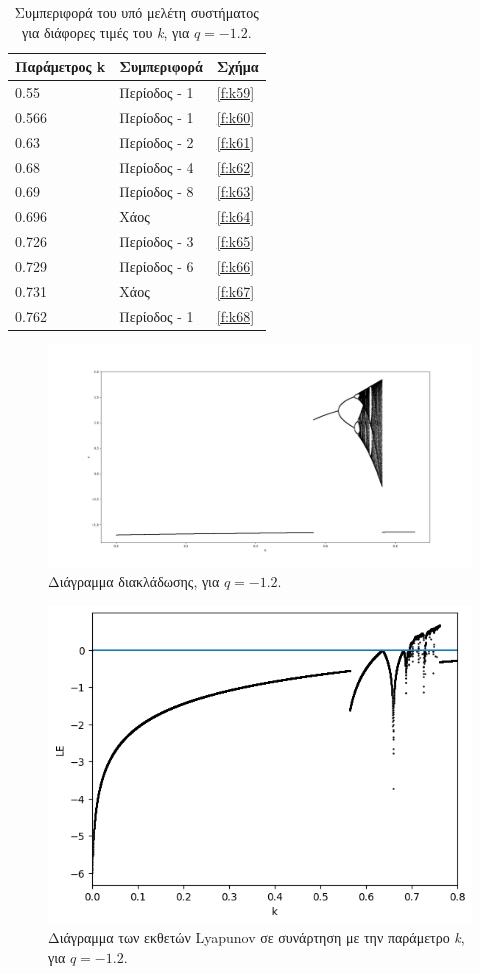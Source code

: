 \begin{table}[h!]
	\centering
	\caption{ Συμπεριφορά του υπό μελέτη συστήματος για διάφορες τιμές του \emph{k}, για $q=-1.2$.}
	\label{tab:abc5}
	\begin{tabular}{l | l | l}
		Παράμετρος k & Συμπεριφορά & Σχήμα\\
		\hline
		0.55 &  Περίοδος -  1 & \ref{f:k59}\\
		0.566 &  Περίοδος -  1 & \ref{f:k60}\\
		0.63& Περίοδος -  2 & \ref{f:k61}\\
		0.68& Περίοδος -  4 & \ref{f:k62}\\
		0.69 &  Περίοδος -  8 & \ref{f:k63}\\
		0.696& Χάος & \ref{f:k64}\\
		0.726& Περίοδος -  3 & \ref{f:k65}\\
		0.729& Περίοδος -  6 & \ref{f:k66}\\
		0.731& Χάος & \ref{f:k67}\\
		0.762 &  Περίοδος -  1 & \ref{f:k68}\\
	\end{tabular}
\end{table}

\begin{figure}[h!]
	\centering
	\includegraphics[width=0.8\linewidth]{LateX images/graphs q12/g1}
	\caption{ Διάγραμμα διακλάδωσης, για $q=-1.2$.}
	\label{f:g16}
\end{figure}

\begin{figure}[h!]
	\centering
	\includegraphics[width=0.6\linewidth]{LateX images/graphs q12/g2}
	\caption{Διάγραμμα των εκθετών Lyapunov σε συνάρτηση με την παράμετρο \emph{k}, για $q=-1.2$.}
	\label{f:g17}
\end{figure}

